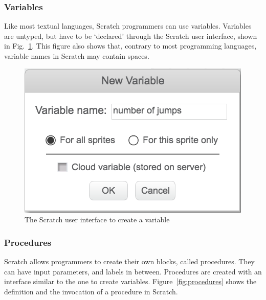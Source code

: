\documentclass[conference]{IEEEtran}
\begin{document}


\subsubsection{Variables}
Like most textual languages, Scratch programmers can use variables. Variables are untyped, but have to be `declared' through the Scratch user interface, shown in Fig.~\ref{fig:ui-vars}. This figure also shows that, contrary to most programming languages, variable names in Scratch may contain spaces.

\begin{figure}[tb]
  \begin{center}
  \includegraphics[scale=0.45]{fig/ui-vars.png}
  \caption{The Scratch user interface to create a variable}
  \label{fig:ui-vars}
  \end{center}
\end{figure} 

\subsubsection{Procedures} \label {sec:Scratch_func}
Scratch allows programmers to create their own blocks, called procedures. They can have input parameters, and labels in between. Procedures are created with an interface similar to the one to create variables. Figure~\ref{fig:procedures} shows the definition and the invocation of a procedure in Scratch.
\end{document}
